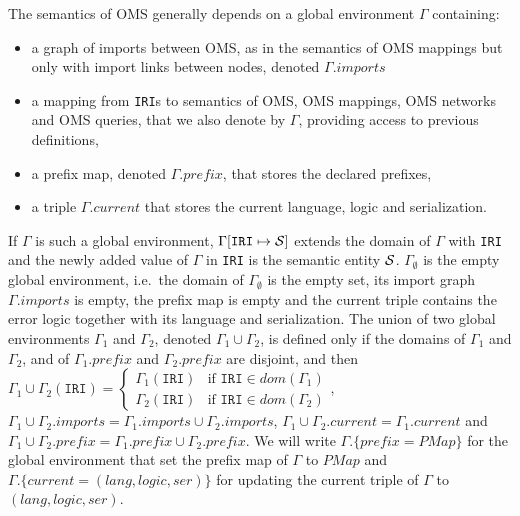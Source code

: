 \documentclass[10pt,fleqn,%
\ifpretendfinal
final%
\else
draft%
\fi,
]{scrreprt}
\newcommand*{\syntax}[1]{\texttt{#1}}
\newcommand{\semdom}[1]{
\begin{center}
\fbox{$#1$}
\end{center}
}
\newcommand{\prefix}{\mathit{prefix}}
\newcommand{\current}{\mathit{current}}
\newcommand{\PMap}{\mathit{PMap}}
\begin{document}
The semantics of OMS generally depends on a global environment
$\Gamma$ containing:
 \begin{itemize}
    \item a graph of imports between OMS, as in the semantics of OMS mappings but
          only with import links between nodes, denoted $\Gamma.imports$
    \item a mapping from \syntax{IRI}s to semantics of OMS, OMS mappings, OMS networks and OMS queries, that 
               we also denote by $\Gamma$, providing access to previous definitions,
    \item a prefix map, denoted $\Gamma.\prefix$, that stores the declared prefixes,
    \item a triple $\Gamma.\current$ that stores the current language, logic and serialization. 
 \end{itemize}

If $\Gamma$ is such a global environment, $\Gamma[\syntax{IRI} \mapsto \cS]$
extends the domain of $\Gamma$ with \syntax{IRI} and
the newly added value of $\Gamma$ in \syntax{IRI} is the semantic entity ${\cal S}$.
 $\Gamma_\emptyset$ is the empty global environment, i.e.~the domain of $\Gamma_\emptyset$ is the empty set, its import graph $\Gamma.imports$ is empty,
the prefix map is empty and the current triple contains the error logic together with its language and serialization.
The union of two global environments $\Gamma_1$ and $\Gamma_2$, 
denoted $\Gamma_1\cup\Gamma_2$, is defined only if the domains of $\Gamma_1$ and $\Gamma_2$,
and of $\Gamma_1.\prefix$ and $\Gamma_2.\prefix$ are disjoint, and then
$\Gamma_1\cup\Gamma_2(\syntax{IRI}) = \begin{cases}
\Gamma_1(\syntax{IRI})& \mbox{if } \syntax{IRI} \in dom(\Gamma_1) \\
\Gamma_2(\syntax{IRI})& \mbox{if } \syntax{IRI} \in dom(\Gamma_2)
\end{cases}$, 
$\Gamma_1\cup\Gamma_2.imports = \Gamma_1.imports \cup \Gamma_2.imports$,
$\Gamma_1\cup\Gamma_2.\current = \Gamma_1.\current$
and $\Gamma_1\cup\Gamma_2.\prefix = \Gamma_1.\prefix \cup \Gamma_2.\prefix$.
We will write $\Gamma.\{\prefix = \PMap\}$ for the global environment that set the prefix map of 
$\Gamma$ to $\PMap$ and $\Gamma.\{\current  = (lang, logic, ser)\}$ for updating the current triple of $\Gamma$ to
$(lang, logic, ser)$.


\end{document}
